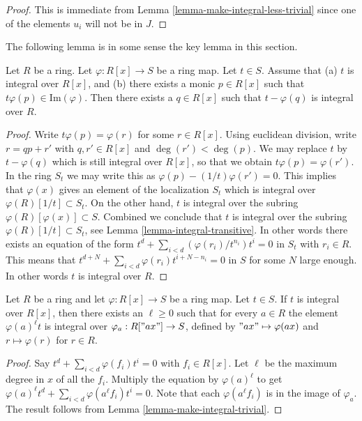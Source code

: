 \begin{proof}
This is immediate from Lemma \ref{lemma-make-integral-less-trivial}
since one of the elements $u_i$ will not be in $J$.
\end{proof}

\noindent
The following lemma is in some sense the key lemma in this
section.

\begin{lemma}
\label{lemma-make-integral-trick}
Let $R$ be a ring. Let $\varphi : R[x] \to S$ be
a ring map. Let $t \in S$.
Assume that (a) $t$ is integral over $R[x]$,
and (b) there exists a monic $p \in R[x]$ such that
$t \varphi(p) \in \text{Im}(\varphi)$. Then there
exists a $q \in R[x]$ such that $t - \varphi(q)$
is integral over $R$.
\end{lemma}

\begin{proof}
Write $t \varphi(p) = \varphi(r)$ for some $r \in R[x]$.
Using euclidean division, write $r = qp + r'$ with
$q, r' \in R[x]$ and $\deg(r') < \deg(p)$. We may replace
$t$ by $t - \varphi(q)$ which is still integral over
$R[x]$, so that we obtain $t \varphi(p) = \varphi(r')$.
In the ring $S_t$ we may write this as
$\varphi(p) - (1/t) \varphi(r') = 0$.
This implies that $\varphi(x)$ gives an element of the
localization $S_t$ which is integral over
$\varphi(R)[1/t] \subset S_t$. On the other hand,
$t$ is integral over the subring $\varphi(R)[\varphi(x)] \subset S$.
Combined we conclude that $t$ is integral over
the subring $\varphi(R)[1/t] \subset S_t$, see Lemma
\ref{lemma-integral-transitive}. In other words
there exists an equation of the form
$t^d + \sum_{i<d} (\varphi(r_i)/t^{n_i}) t^i = 0$
in $S_t$ with $r_i \in R$. This means that
$t^{d + N} + \sum_{i < d} \varphi(r_i) t^{i + N - n_i} = 0$ in $S$
for some $N$ large enough. In other words
$t$ is integral over $R$.
\end{proof}

\begin{lemma}
\label{lemma-change-equation-multiply}
Let $R$ be a ring and let $\varphi : R[x] \to S$ be
a ring map. Let $t \in S$. If $t$ is integral over
$R[x]$, then there exists an $\ell \geq 0$ such that
for every $a \in R$ the element $\varphi(a)^\ell t$
is integral over $\varphi_a : R["ax"] \to S$, defined by
$"ax" \mapsto \varphi(ax)$ and $r \mapsto \varphi(r)$
for $r\in R$.
\end{lemma}

\begin{proof}
Say $t^d + \sum_{i<d} \varphi(f_i)t^i = 0$
with $f_i \in R[x]$. Let $\ell$ be the maximum degree
in $x$ of all the $f_i$. Multiply the equation
by $\varphi(a)^\ell$ to get
$\varphi(a)^\ell t^d + \sum_{i<d} \varphi(a^\ell f_i)t^i = 0$.
Note that each $\varphi(a^\ell f_i)$ is in the image of
$\varphi_a$. The result follows from
Lemma \ref{lemma-make-integral-trivial}.
\end{proof}

